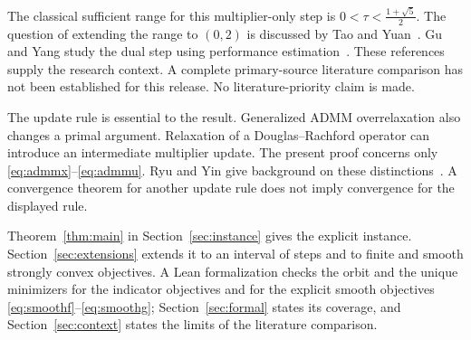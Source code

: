 \documentclass[11pt,a4paper]{article}
\theoremstyle{remark}
\newcommand{\phig}{\frac{1+\sqrt5}{2}}
\begin{document}
The classical sufficient range for this multiplier-only step is
$0<\tau<\phig$. The question of extending the range to $(0,2)$ is
discussed by Tao and Yuan~\cite{TaoYuan}. Gu and Yang study the dual
step using performance estimation~\cite{GuYang}. These references supply
the research context. A complete primary-source literature comparison has not been established
for this release. No literature-priority claim is made.

The update rule is essential to the result. Generalized ADMM overrelaxation
also changes a primal argument. Relaxation of a Douglas--Rachford operator
can introduce an intermediate multiplier update. The present proof concerns
only \eqref{eq:admmx}--\eqref{eq:admmu}. Ryu and Yin give background on
these distinctions~\cite{RyuYin}. A convergence theorem for another update
rule does not imply convergence for the displayed rule.

Theorem~\ref{thm:main} in Section~\ref{sec:instance} gives the explicit
instance. Section~\ref{sec:extensions} extends it to an interval of steps
and to finite and smooth strongly convex objectives. A Lean formalization
checks the orbit and the unique minimizers for the indicator objectives and
for the explicit smooth objectives \eqref{eq:smoothf}--\eqref{eq:smoothg};
Section~\ref{sec:formal} states its coverage, and
Section~\ref{sec:context} states the limits of the literature comparison.
\end{document}
